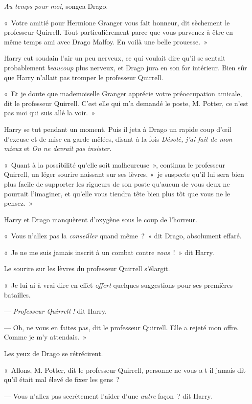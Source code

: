 \emph{Au temps pour moi}, songea Drago.

«~Votre amitié pour Hermione Granger vous fait honneur, dit sèchement le professeur Quirrell. Tout particulièrement parce que vous parvenez à être en même temps ami avec Drago Malfoy. En voilà une belle prouesse.~»

Harry eut soudain l'air un peu nerveux, ce qui voulait dire qu'il se sentait probablement \emph{beaucoup} plus nerveux, et Drago jura en son for intérieur. Bien sûr que Harry n'allait pas tromper le professeur Quirrell.

«~Et je doute que mademoiselle Granger apprécie votre préoccupation amicale, dit le professeur Quirrell. C'est elle qui m'a demandé le poste, M. Potter, ce n'est pas moi qui suis allé la voir.~»

Harry se tut pendant un moment. Puis il jeta à Drago un rapide coup d'œil d'excuse et de mise en garde mêlées, disant à la fois \emph{Désolé, j'ai fait de mon mieux} et \emph{On ne devrait pas insister}.

«~Quant à la possibilité qu'elle soit malheureuse~», continua le professeur Quirrell, un léger sourire naissant sur ses lèvres, «~je suspecte qu'il lui sera bien plus facile de supporter les rigueurs de son poste qu'aucun de vous deux ne pourrait l'imaginer, et qu'elle vous tiendra tête bien plus tôt que vous ne le pensez.~»

Harry et Drago manquèrent d'oxygène sous le coup de l'horreur.

«~Vous n'allez pas la \emph{conseiller} quand même~?~» dit Drago, absolument effaré.

«~Je ne me suis jamais inscrit à un combat contre \emph{vous}~!~» dit Harry.

Le sourire sur les lèvres du professeur Quirrell s'élargit.

«~Je lui ai à vrai dire en effet \emph{offert} quelques suggestions pour ses premières batailles.

--- \emph{Professeur Quirrell} \emph{!} dit Harry.

--- Oh, ne vous en faites pas, dit le professeur Quirrell. Elle a rejeté mon offre. Comme je m'y attendais.~»

Les yeux de Drago se rétrécirent.

«~Allons, M. Potter, dit le professeur Quirrell, personne ne vous a-t-il jamais dit qu'il était mal élevé de fixer les gens~?

--- Vous n'allez pas secrètement l'aider d'une \emph{autre} façon~? dit Harry.

